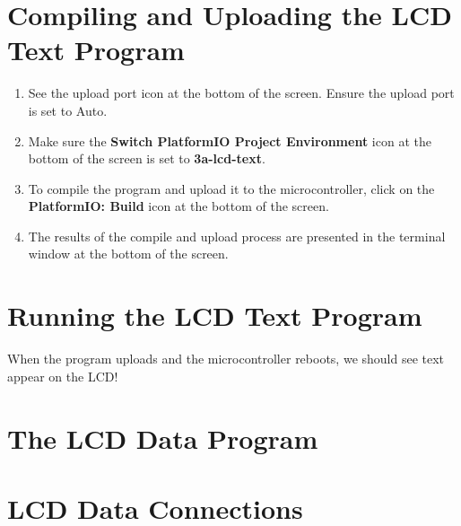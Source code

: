\documentclass{article}
\begin{document}
\section*{Compiling and Uploading the LCD Text Program}
\vspace{3mm}
\begin{enumerate}
    \item See the upload port icon at the bottom of the screen. Ensure the 
    upload port is set to Auto. 
    \vspace{3mm}

    \item Make sure the \textbf{Switch PlatformIO Project Environment} icon 
    at the bottom of the screen is set to \textbf{3a-lcd-text}.
    \vspace{3mm}

    \item To compile the program and upload it to the microcontroller, click 
    on the \textbf{PlatformIO: Build} icon at the bottom of the screen.
    \vspace{3mm}

    \item The results of the compile and upload process are presented in the 
    terminal window at the bottom of the screen.
    \vspace{3mm}

\end{enumerate}
\vspace{3mm}

\section*{Running the LCD Text Program}

When the program uploads and the microcontroller reboots, we should see text 
appear on the LCD!
\newpage

\section*{The LCD Data Program}
\vspace{3mm}

\section*{LCD Data Connections}
\vspace{3mm}
\end{document}
